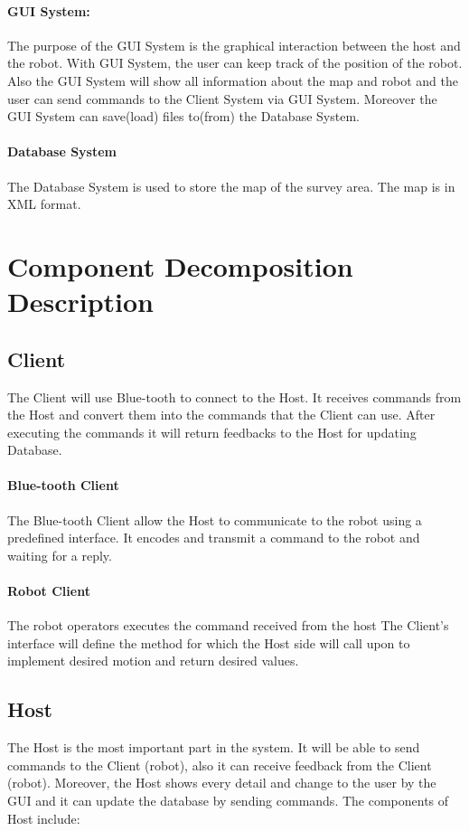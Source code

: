 \documentclass[11pt, a4paper]{report}
\begin{document}
\paragraph{GUI System: }The purpose of the GUI System is the graphical
interaction between the host and the robot. With GUI System, the user can keep track of the position of
 the robot. Also the GUI System will show all information about the map and robot and the
 user can send commands to the Client System via GUI System. Moreover the GUI System can save(load)
  files to(from) the Database System.
\newline
\paragraph{Database System}The Database System is used to store the map of the survey area. 
The map is in XML format. 


\section{Component Decomposition Description}
\subsection{Client} The Client will use Blue-tooth to connect to the Host. 
It receives commands from the Host  and convert them into the commands 
that the Client can use. After executing the commands it will return feedbacks to the Host for 
updating Database.
\paragraph{Blue-tooth Client} The Blue-tooth Client allow the Host to communicate to the robot using a
predefined interface. It encodes and transmit a command to the robot and waiting for a reply.

\paragraph{Robot Client} The robot operators executes the command received from the host
The Client's interface will define the method for which the Host side will call upon to implement
desired motion and return desired values.

\subsection{Host} The Host is the most important part in the system. It will be able to send commands to the Client (robot), also it can receive feedback from the Client (robot). Moreover, the Host shows every detail and change to the user by the GUI and it can update the database by sending commands. The components of Host include:
\end{document}
